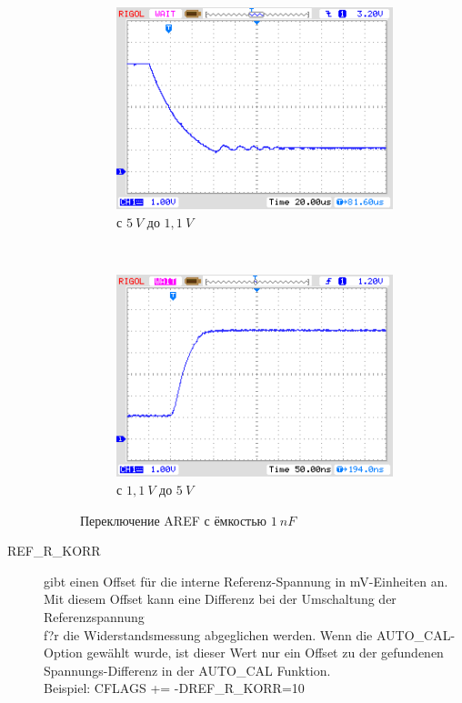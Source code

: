 \begin{description}
\begin{figure}[H]
  \begin{subfigure}[b]{.5\textwidth}
    \centering
    \includegraphics[width=.95\textwidth]{../PNG/AREF2_1V.png}
    \caption{с \(5~V\) до \(1,1~V\)}
    \label{pic:aref1}
  \end{subfigure}
  ~
  \begin{subfigure}[b]{.5\textwidth}
    \centering
    \includegraphics[width=.95\textwidth]{../PNG/AREF2VCC.png}
    \caption{с \(1,1~V\) до \(5~V\)}
    \label{pic:aref5}
  \end{subfigure}
  \caption{Переключение AREF с ёмкостью \(1~nF\)}
\end{figure}
  \item[REF\_R\_KORR] gibt einen Offset für die interne Referenz-Spannung in mV-Einheiten an.
Mit diesem Offset kann eine Differenz bei der Umschaltung der Referenzspannung\\
f?r die Widerstandsmessung abgeglichen werden.
Wenn die AUTO\_CAL-Option gewählt wurde, ist dieser Wert nur ein Offset zu der gefundenen Spannungs-Differenz in der
AUTO\_CAL Funktion.\\
Beispiel: CFLAGS += -DREF\_R\_KORR=10


\end{description}
